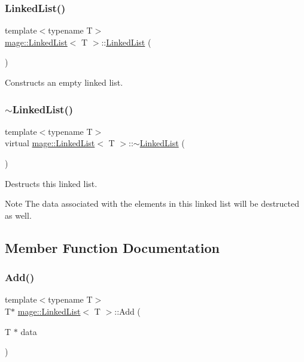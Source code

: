 \subsubsection{\texorpdfstring{Linked\+List()}{LinkedList()}}
{\footnotesize\ttfamily template$<$typename T$>$ \\
\hyperlink{classmage_1_1_linked_list}{mage\+::\+Linked\+List}$<$ T $>$\+::\hyperlink{classmage_1_1_linked_list}{Linked\+List} (\begin{DoxyParamCaption}{ }\end{DoxyParamCaption})}

Constructs an empty linked list. \hypertarget{classmage_1_1_linked_list_a88cb2ec52e90f3658d9735b4948cccdb}{}\label{classmage_1_1_linked_list_a88cb2ec52e90f3658d9735b4948cccdb} 
\subsubsection{\texorpdfstring{$\sim$\+Linked\+List()}{~LinkedList()}}
{\footnotesize\ttfamily template$<$typename T$>$ \\
virtual \hyperlink{classmage_1_1_linked_list}{mage\+::\+Linked\+List}$<$ T $>$\+::$\sim$\hyperlink{classmage_1_1_linked_list}{Linked\+List} (\begin{DoxyParamCaption}{ }\end{DoxyParamCaption})\hspace{0.3cm}{\ttfamily [virtual]}}

Destructs this linked list.

\begin{DoxyNote}{Note}
The data associated with the elements in this linked list will be destructed as well. 
\end{DoxyNote}


\subsection{Member Function Documentation}
\hypertarget{classmage_1_1_linked_list_ac6cd236aab89f296d3c112c05b2337e2}{}\label{classmage_1_1_linked_list_ac6cd236aab89f296d3c112c05b2337e2} 
\subsubsection{\texorpdfstring{Add()}{Add()}}
{\footnotesize\ttfamily template$<$typename T$>$ \\
T$\ast$ \hyperlink{classmage_1_1_linked_list}{mage\+::\+Linked\+List}$<$ T $>$\+::Add (\begin{DoxyParamCaption}\item[{T $\ast$}]{data }\end{DoxyParamCaption})}

